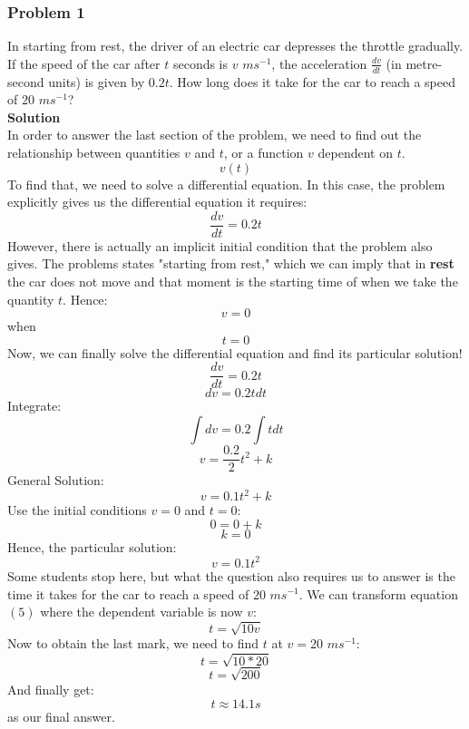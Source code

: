 \documentclass[hidelinks, a4paper, 12pt]{article}
\begin{document}
            \subsubsection{Problem 1}
                In starting from rest, the driver of an electric car depresses the throttle gradually. If the speed
                of the car after $t$ seconds is $v$ $ms^{-1}$, the acceleration $\frac{dv}{dt}$ (in metre-second units)
                is given by $0.2t$. How long does it take for the car to reach a speed of $20$ $ms^{-1}$?\\[\baselineskip]
                \textbf{Solution}\\
                    In order to answer the last section of the problem, we need to find out the relationship between quantities $v$
                    and $t$, or a function $v$ dependent on $t$.
                    \[v(t)\]
                    To find that, we need to solve a differential equation. In this case, the problem explicitly gives us the differential equation it requires:
                    \[\frac{dv}{dt} = 0.2t\]
                    However, there is actually an implicit initial condition that the problem also gives.
                    The problems states "starting from rest," which we can imply that in \textbf{rest} the car does not
                    move and that moment is the starting time of when we take the quantity $t$. Hence:
                    \[v = 0\] when \[t = 0\]
                    Now, we can finally solve the differential equation and find its particular solution!
                    \[\frac{dv}{dt} = 0.2t\]
                    \[dv = 0.2tdt\]
                    Integrate: 
                    \[\int dv = 0.2\int tdt\]
                    \[v = \frac{0.2}{2}t^2 + k\]
                    General Solution:
                    \[v = 0.1t^2 + k\]
                    Use the initial conditions $v = 0$ and $t = 0$:
                    \[0 = 0 + k\]
                    \[k = 0\]
                    Hence, the particular solution:
                    \begin{equation}
                        v = 0.1t^2
                    \end{equation}
                    Some students stop here, but what the question also requires us to answer is the time it takes
                    for the car to reach a speed of $20$ $ms^{-1}$. We can transform equation $(5)$ where the dependent variable is now $v$:
                    \[t = \sqrt{10v}\]
                    Now to obtain the last mark, we need to find $t$ at $v=20$ $ms^{-1}$:
                    \[t = \sqrt{10*20}\]
                    \[t = \sqrt{200}\]
                    And finally get:
                    \[t \approx 14.1s\]
                    as our final answer.
\end{document}

